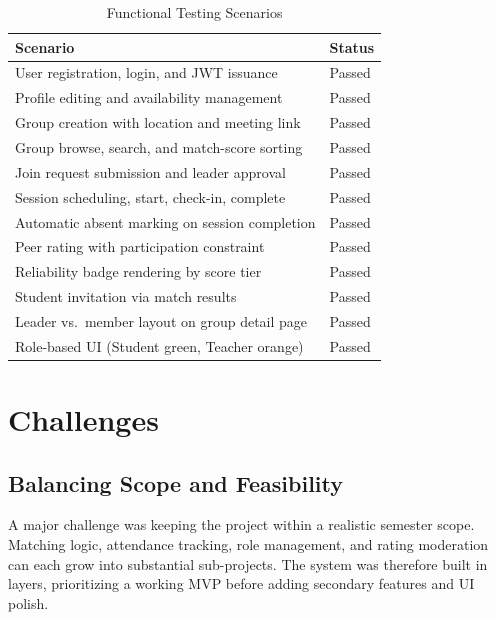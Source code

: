 \documentclass[conference]{IEEEtran}
\begin{document}
\begin{table}[htbp]
\caption{Functional Testing Scenarios}
\label{tab:testing}
\begin{center}
\begin{tabular}{|>{\raggedright\arraybackslash}p{5.5cm}|>{\centering\arraybackslash}p{1.7cm}|}
\hline
\textbf{Scenario} & \textbf{Status} \\
\hline
User registration, login, and JWT issuance & Passed \\
\hline
Profile editing and availability management & Passed \\
\hline
Group creation with location and meeting link & Passed \\
\hline
Group browse, search, and match-score sorting & Passed \\
\hline
Join request submission and leader approval & Passed \\
\hline
Session scheduling, start, check-in, complete & Passed \\
\hline
Automatic absent marking on session completion & Passed \\
\hline
Peer rating with participation constraint & Passed \\
\hline
Reliability badge rendering by score tier & Passed \\
\hline
Student invitation via match results & Passed \\
\hline
Leader vs.\ member layout on group detail page & Passed \\
\hline
Role-based UI (Student green, Teacher orange) & Passed \\
\hline
\end{tabular}
\end{center}
\end{table}

\section{Challenges}

\subsection{Balancing Scope and Feasibility}
A major challenge was keeping the project within a realistic semester scope. Matching logic, attendance tracking, role management, and rating moderation can each grow into substantial sub-projects. The system was therefore built in layers, prioritizing a working MVP before adding secondary features and UI polish.
\end{document}
